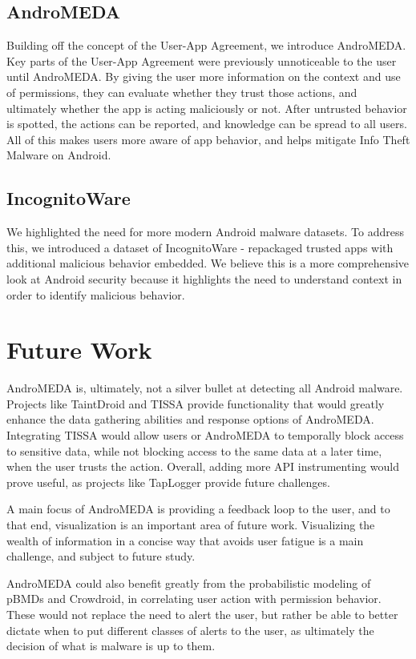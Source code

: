 \subsection{AndroMEDA}
Building off the concept of the User-App Agreement, we introduce AndroMEDA. Key parts of the User-App Agreement were previously unnoticeable to the user until AndroMEDA. By giving the user more information on the context and use of permissions, they can evaluate whether they trust those actions, and ultimately whether the app is acting maliciously or not. After untrusted behavior is spotted, the actions can be reported, and knowledge can be spread to all users. All of this makes users more aware of app behavior, and helps mitigate Info Theft Malware on Android.

\subsection{IncognitoWare}
We highlighted the need for more modern Android malware datasets. To address this, we introduced a dataset of IncognitoWare - repackaged trusted apps with additional malicious behavior embedded. We believe this is a more comprehensive look at Android security because it highlights the need to understand context in order to identify malicious behavior.

\section{Future Work}
\label{sec:futurework}
AndroMEDA is, ultimately, not a silver bullet at detecting all Android malware. Projects like TaintDroid and TISSA provide functionality that would greatly enhance the data gathering abilities and response options of AndroMEDA. Integrating TISSA would allow users or AndroMEDA to temporally block access to sensitive data, while not blocking access to the same data at a later time, when the user trusts the action. Overall, adding more API instrumenting would prove useful, as projects like TapLogger provide future challenges.

A main focus of AndroMEDA is providing a feedback loop to the user, and to that end, visualization is an important area of future work. Visualizing the wealth of information in a concise way that avoids user fatigue is a main challenge, and subject to future study.

AndroMEDA could also benefit greatly from the probabilistic modeling of pBMDs and Crowdroid, in correlating user action with permission behavior. These would not replace the need to alert the user, but rather be able to better dictate when to put different classes of alerts to the user, as ultimately the decision of what is malware is up to them.

